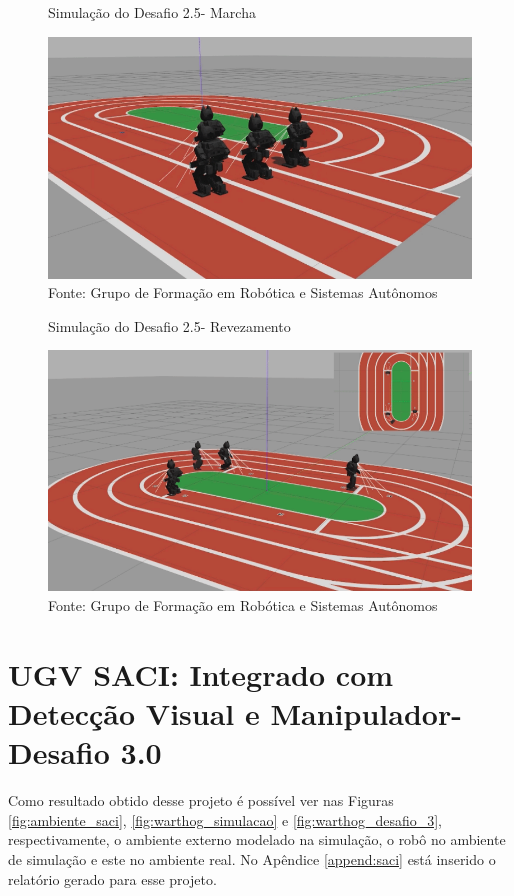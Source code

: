 \begin{figure}[H]
    \caption{Simulação do Desafio 2.5- Marcha}
    \centering
    \includegraphics[width= \textwidth]{Figures/marcha.png}
    \caption*{Fonte: Grupo de Formação em Robótica e Sistemas Autônomos}
    \label{fig:marcha_darwinop}
\end{figure}



\begin{figure}[H]
    \caption{Simulação do Desafio 2.5- Revezamento}
    \centering
    \includegraphics[width= \textwidth]{Figures/revezamento.png}
    \caption*{Fonte: Grupo de Formação em Robótica e Sistemas Autônomos}
    \label{fig:revezamento_darwinop}
\end{figure}

\section{UGV SACI: Integrado com Detecção Visual e Manipulador- Desafio 3.0}
\label{sec:desafio_3_0}
Como resultado obtido desse projeto é possível ver nas Figuras \ref{fig:ambiente_saci}, \ref{fig:warthog_simulacao} e \ref{fig:warthog_desafio_3}, respectivamente, o ambiente externo modelado na simulação, o robô no ambiente de simulação e este no ambiente real. No Apêndice \ref{append:saci} está inserido o relatório gerado para esse projeto.


